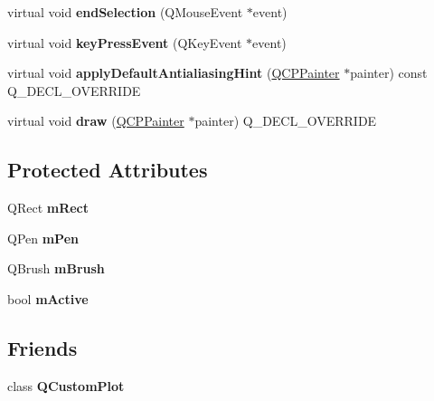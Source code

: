 \begin{DoxyCompactItemize}
\item 
\mbox{\label{class_q_c_p_selection_rect_a24423c70a6443a99fe52e59352e8ef4e}} 
virtual void {\bfseries end\+Selection} (Q\+Mouse\+Event $\ast$event)
\item 
\mbox{\label{class_q_c_p_selection_rect_a104510526464f94a936e84b33f86b629}} 
virtual void {\bfseries key\+Press\+Event} (Q\+Key\+Event $\ast$event)
\item 
\mbox{\label{class_q_c_p_selection_rect_a93428a903587c0c2620c92d7f59352af}} 
virtual void {\bfseries apply\+Default\+Antialiasing\+Hint} (\hyperlink{class_q_c_p_painter}{Q\+C\+P\+Painter} $\ast$painter) const Q\+\_\+\+D\+E\+C\+L\+\_\+\+O\+V\+E\+R\+R\+I\+DE
\item 
\mbox{\label{class_q_c_p_selection_rect_a60890b3483c8644bba63445cc37fd16d}} 
virtual void {\bfseries draw} (\hyperlink{class_q_c_p_painter}{Q\+C\+P\+Painter} $\ast$painter) Q\+\_\+\+D\+E\+C\+L\+\_\+\+O\+V\+E\+R\+R\+I\+DE
\end{DoxyCompactItemize}
\subsection*{Protected Attributes}
\begin{DoxyCompactItemize}
\item 
\mbox{\label{class_q_c_p_selection_rect_a45a2600ef19c8f7b5ec6134beab036cf}} 
Q\+Rect {\bfseries m\+Rect}
\item 
\mbox{\label{class_q_c_p_selection_rect_ae255dec12cd531071115bd667f0fd815}} 
Q\+Pen {\bfseries m\+Pen}
\item 
\mbox{\label{class_q_c_p_selection_rect_a1bda3f02c2e4da58c856d19695028cbe}} 
Q\+Brush {\bfseries m\+Brush}
\item 
\mbox{\label{class_q_c_p_selection_rect_a1c167356b0bc59e62691bff8c90f5851}} 
bool {\bfseries m\+Active}
\end{DoxyCompactItemize}
\subsection*{Friends}
\begin{DoxyCompactItemize}
\item 
\mbox{\label{class_q_c_p_selection_rect_a00f8b42d059625f815808a7cc99c2f04}} 
class {\bfseries Q\+Custom\+Plot}
\end{DoxyCompactItemize}


